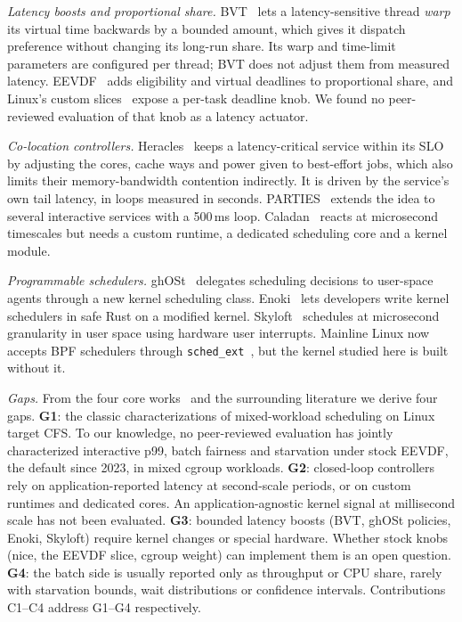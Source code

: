 \documentclass[conference]{IEEEtran}
\newcommand{\ms}{\,ms}
\begin{document}
\textit{Latency boosts and proportional share.} BVT~\cite{duda1999bvt} lets a latency-sensitive thread \emph{warp} its virtual time backwards by a bounded amount, which gives it dispatch preference without changing its long-run share. Its warp and time-limit parameters are configured per thread; BVT does not adjust them from measured latency. EEVDF~\cite{stoica1996eevdf} adds eligibility and virtual deadlines to proportional share, and Linux's custom slices~\cite{corbet2024eevdf} expose a per-task deadline knob. We found no peer-reviewed evaluation of that knob as a latency actuator.

\textit{Co-location controllers.} Heracles~\cite{lo2015heracles} keeps a latency-critical service within its SLO by adjusting the cores, cache ways and power given to best-effort jobs, which also limits their memory-bandwidth contention indirectly. It is driven by the service's own tail latency, in loops measured in seconds. PARTIES~\cite{chen2019parties} extends the idea to several interactive services with a 500\ms{} loop. Caladan~\cite{fried2020caladan} reacts at microsecond timescales but needs a custom runtime, a dedicated scheduling core and a kernel module.

\textit{Programmable schedulers.} ghOSt~\cite{humphries2021ghost} delegates scheduling decisions to user-space agents through a new kernel scheduling class. Enoki~\cite{miller2024enoki} lets developers write kernel schedulers in safe Rust on a modified kernel. Skyloft~\cite{jia2024skyloft} schedules at microsecond granularity in user space using hardware user interrupts. Mainline Linux now accepts BPF schedulers through \texttt{sched\_ext}~\cite{kernel-sched-ext}, but the kernel studied here is built without it.

\textit{Gaps.} From the four core works~\cite{leverich2014reconciling,duda1999bvt,lo2015heracles,humphries2021ghost} and the surrounding literature we derive four gaps.
\textbf{G1}: the classic characterizations of mixed-workload scheduling on Linux target CFS. To our knowledge, no peer-reviewed evaluation has jointly characterized interactive p99, batch fairness and starvation under stock EEVDF, the default since 2023, in mixed cgroup workloads.
\textbf{G2}: closed-loop controllers rely on application-reported latency at second-scale periods, or on custom runtimes and dedicated cores. An application-agnostic kernel signal at millisecond scale has not been evaluated.
\textbf{G3}: bounded latency boosts (BVT, ghOSt policies, Enoki, Skyloft) require kernel changes or special hardware. Whether stock knobs (nice, the EEVDF slice, cgroup weight) can implement them is an open question.
\textbf{G4}: the batch side is usually reported only as throughput or CPU share, rarely with starvation bounds, wait distributions or confidence intervals.
Contributions C1--C4 address G1--G4 respectively.
\end{document}
